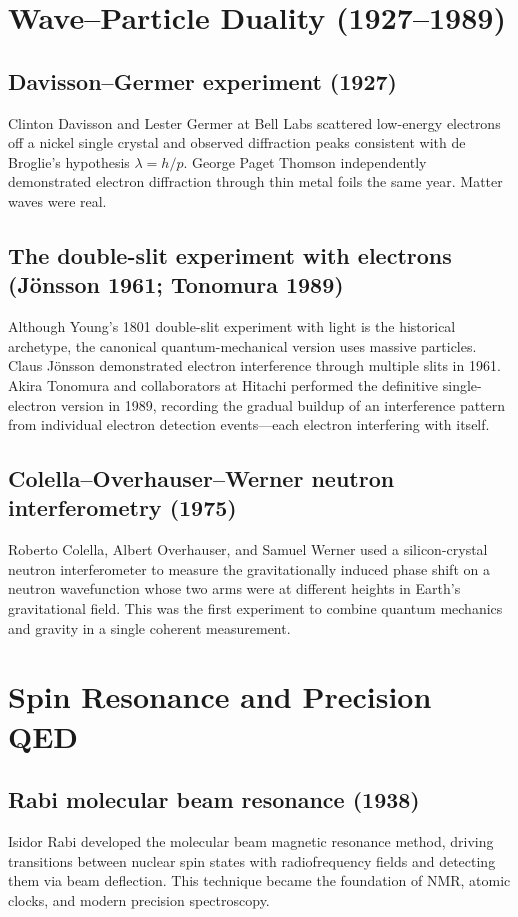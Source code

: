 \documentclass[11pt]{article}
\begin{document}
\section{Wave--Particle Duality (1927--1989)}

\subsection{Davisson--Germer experiment (1927)}
Clinton Davisson and Lester Germer at Bell Labs scattered low-energy electrons off a nickel single crystal and observed diffraction peaks consistent with de Broglie's hypothesis $\lambda = h/p$. George Paget Thomson independently demonstrated electron diffraction through thin metal foils the same year. Matter waves were real.

\subsection{The double-slit experiment with electrons (J\"onsson 1961; Tonomura 1989)}
Although Young's 1801 double-slit experiment with light is the historical archetype, the canonical quantum-mechanical version uses massive particles. Claus J\"onsson demonstrated electron interference through multiple slits in 1961. Akira Tonomura and collaborators at Hitachi performed the definitive single-electron version in 1989, recording the gradual buildup of an interference pattern from individual electron detection events---each electron interfering with itself.

\subsection{Colella--Overhauser--Werner neutron interferometry (1975)}
Roberto Colella, Albert Overhauser, and Samuel Werner used a silicon-crystal neutron interferometer to measure the gravitationally induced phase shift on a neutron wavefunction whose two arms were at different heights in Earth's gravitational field. This was the first experiment to combine quantum mechanics and gravity in a single coherent measurement.

\section{Spin Resonance and Precision QED}

\subsection{Rabi molecular beam resonance (1938)}
Isidor Rabi developed the molecular beam magnetic resonance method, driving transitions between nuclear spin states with radiofrequency fields and detecting them via beam deflection. This technique became the foundation of NMR, atomic clocks, and modern precision spectroscopy.
\end{document}
